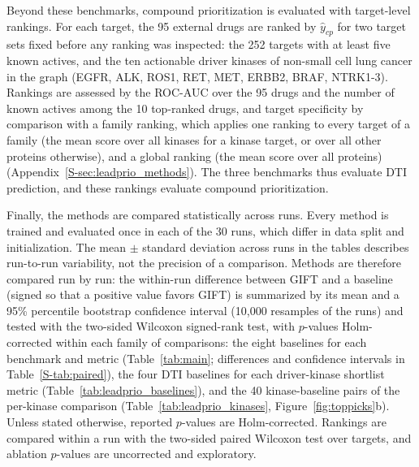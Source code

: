 \documentclass[10pt,letterpaper]{article}
\begin{document}
Beyond these benchmarks, compound prioritization is evaluated with target-level rankings. For each target, the 95 external drugs are ranked by $\hat{y}_{cp}$ for two target sets fixed before any ranking was inspected: the 252 targets with at least five known actives, and the ten actionable driver kinases of non-small cell lung cancer in the graph (EGFR, ALK, ROS1, RET, MET, ERBB2, BRAF, NTRK1-3). Rankings are assessed by the ROC-AUC over the 95 drugs and the number of known actives among the 10 top-ranked drugs, and target specificity by comparison with a family ranking, which applies one ranking to every target of a family (the mean score over all kinases for a kinase target, or over all other proteins otherwise), and a global ranking (the mean score over all proteins) (Appendix~\ref{S-sec:leadprio_methods}). The three benchmarks thus evaluate DTI prediction, and these rankings evaluate compound prioritization.

Finally, the methods are compared statistically across runs. Every method is trained and evaluated once in each of the 30 runs, which differ in data split and initialization. The mean $\pm$ standard deviation across runs in the tables describes run-to-run variability, not the precision of a comparison. Methods are therefore compared run by run: the within-run difference between GIFT and a baseline (signed so that a positive value favors GIFT) is summarized by its mean and a 95\% percentile bootstrap confidence interval (10,000 resamples of the runs) and tested with the two-sided Wilcoxon signed-rank test, with $p$-values Holm-corrected within each family of comparisons: the eight baselines for each benchmark and metric (Table~\ref{tab:main}; differences and confidence intervals in Table~\ref{S-tab:paired}), the four DTI baselines for each driver-kinase shortlist metric (Table~\ref{tab:leadprio_baselines}), and the 40 kinase-baseline pairs of the per-kinase comparison (Table~\ref{tab:leadprio_kinases}, Figure~\ref{fig:toppicks}b). Unless stated otherwise, reported $p$-values are Holm-corrected. Rankings are compared within a run with the two-sided paired Wilcoxon test over targets, and ablation $p$-values are uncorrected and exploratory.

%
\end{document}
